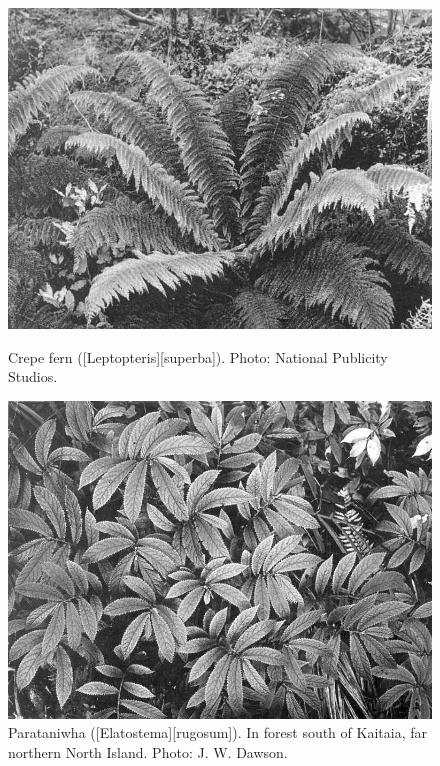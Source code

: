 \begin{figure}[htb]
	\centering
	\begin{minipage}[t]{0.487\textwidth}
		\centering
		\includegraphics[width=\textwidth]{graphics/figure62crepefern.jpg}
    	\caption[Crepe fern (\emph{Leptopteris superba})]{Crepe fern ([Leptopteris][superba]).
    	Photo: National Publicity Studios.}%
    	\label{fig:62crepefern}
	\end{minipage}\hfill%
	\begin{minipage}[t]{0.493\textwidth}
    	\centering
    	\includegraphics[width=\textwidth]{graphics/figure63parataniwha.jpg}
    	\caption[Parataniwha]{Parataniwha ([Elatostema][rugosum]).
        In forest south of Kaitaia, far northern North Island.
    	Photo: J. W. Dawson.}%
    	\label{fig:63parataniwha}
	\end{minipage}
\end{figure}

